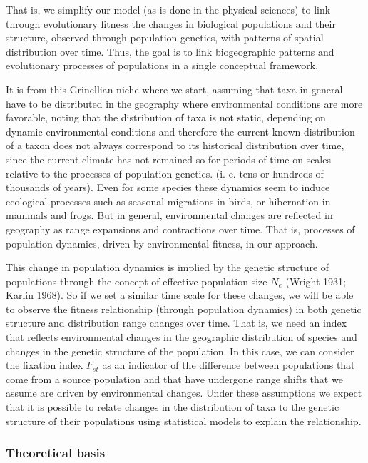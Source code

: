 \documentclass[
]{article}
\begin{document}
That is, we simplify our model (as is done in the physical sciences) to
link through evolutionary fitness the changes in biological populations and their
structure, observed through population genetics, with patterns of
spatial distribution over time. Thus, the goal is to link biogeographic
patterns and evolutionary processes of populations in a single
conceptual framework.

It is from this Grinellian niche where we start, assuming that taxa in
general have to be distributed in the geography where environmental
conditions are more favorable, noting that the distribution of taxa is
not static, depending on dynamic environmental conditions and therefore
the current known distribution of a taxon does not always correspond to
its historical distribution over time, since the current climate has not
remained so for periods of time on scales relative to the processes of
population genetics. (i. e. tens or hundreds of thousands of years).
Even for some species these dynamics seem to induce ecological processes
such as seasonal migrations in birds, or hibernation in mammals and
frogs. But in general, environmental changes are reflected in geography
as range expansions and contractions over time. That is, processes of
population dynamics, driven by environmental fitness, in our approach.

This change in population dynamics is implied by the genetic structure
of populations through the concept of effective population size \(N_e\)
(Wright 1931; Karlin 1968). So if we set a similar time scale for these
changes, we will be able to observe the fitness relationship (through
population dynamics) in both genetic structure and distribution range
changes over time. That is, we need an index that reflects environmental
changes in the geographic distribution of species and changes in the
genetic structure of the population. In this case, we can consider the
fixation index \(F_{st}\) as an indicator of the difference between
populations that come from a source population and that have undergone
range shifts that we assume are driven by environmental changes. Under
these assumptions we expect that it is possible to relate changes in the
distribution of taxa to the genetic structure of their populations using
statistical models to explain the relationship.

\hypertarget{theoretical-basis}{%
\subsubsection{Theoretical basis}\label{theoretical-basis}}
\end{document}
